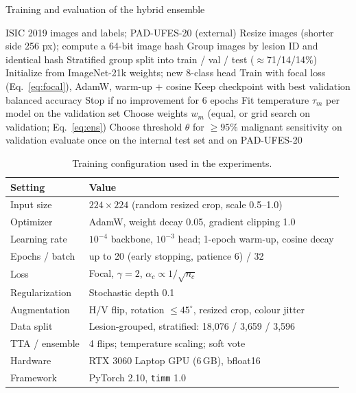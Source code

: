 \begin{algorithm}[t]
\caption{Training and evaluation of the hybrid ensemble}
\label{alg:train}
\footnotesize
\begin{algorithmic}[1]
\Require ISIC 2019 images and labels; PAD-UFES-20 (external)
\State Resize images (shorter side 256 px); compute a 64-bit image hash
\State Group images by lesion ID and identical hash
\State Stratified group split into train / val / test ($\approx$71/14/14\%)
  \State Initialize from ImageNet-21k weights; new 8-class head
    \State Train with focal loss (Eq.~\ref{eq:focal}), AdamW, warm-up + cosine
    \State Keep checkpoint with best validation balanced accuracy
    \State Stop if no improvement for 6 epochs
  \EndFor
\EndFor
\State Fit temperature $\tau_m$ per model on the validation set
\State Choose weights $w_m$ (equal, or grid search on validation; Eq.~\ref{eq:ens})
\State Choose threshold $\theta$ for $\geq95\%$ malignant sensitivity on validation
\State \Return evaluate once on the internal test set and on PAD-UFES-20
\end{algorithmic}
\end{algorithm}

\begin{table}[t]
\centering
\caption{Training configuration used in the experiments.}
\label{tab:hyper}
\renewcommand{\arraystretch}{1.12}
\footnotesize
\begin{tabularx}{\columnwidth}{@{}l Y@{}}
\toprule
\textbf{Setting} & \textbf{Value} \\
\midrule
Input size & $224\times224$ (random resized crop, scale 0.5--1.0) \\
Optimizer & AdamW, weight decay 0.05, gradient clipping 1.0 \\
Learning rate & $10^{-4}$ backbone, $10^{-3}$ head; 1-epoch warm-up, cosine decay \\
Epochs / batch & up to 20 (early stopping, patience 6) / 32 \\
Loss & Focal, $\gamma=2$, $\alpha_c\propto 1/\sqrt{n_c}$ \\
Regularization & Stochastic depth 0.1 \\
Augmentation & H/V flip, rotation $\leq45^\circ$, resized crop, colour jitter \\
Data split & Lesion-grouped, stratified: 18{,}076 / 3{,}659 / 3{,}596 \\
TTA / ensemble & 4 flips; temperature scaling; soft vote \\
Hardware & RTX 3060 Laptop GPU (6\,GB), bfloat16 \\
Framework & PyTorch 2.10, \texttt{timm} 1.0 \\
\bottomrule
\end{tabularx}
\end{table}

